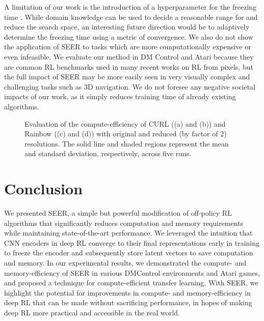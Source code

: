 \documentclass{article}
\begin{document}
A limitation of our work is the introduction of a hyperparameter for the freezing time . While domain knowledge can be used to decide a reasonable range for  and reduce the search space, an interesting future direction would be to adaptively determine the freezing time using a metric of convergence. We also do not show the application of SEER to tasks which are more computationally expensive or even infeasible. We evaluate our method in DM Control and Atari because they are common RL benchmarks used in many recent works on RL from pixels, but the full impact of SEER may be more easily seen in very visually complex and challenging tasks such as 3D navigation. We do not foresee any negative societal impacts of our work, as it simply reduces training time of already existing algorithms.

\begin{figure*} [t] \centering
{} 
\caption{Evaluation of the compute-efficiency of CURL ((a) and (b)) and Rainbow ((c) and (d)) with original and reduced (by factor of 2) resolutions. The solid line and shaded regions represent the mean and standard deviation, respectively, across five runs.} \label{fig:reduce_res_results}
\end{figure*}

\section{Conclusion}
We presented SEER, a simple but powerful modification of off-policy RL algorithms that significantly reduces computation and memory requirements while maintaining state-of-the-art performance. We leveraged the intuition that CNN encoders in deep RL converge to their final representations early in training to freeze the encoder and subsequently store latent vectors to save computation and memory. In our experimental results, we demonstrated the compute- and memory-efficiency of SEER in various DMControl environments and Atari games, and proposed a technique for compute-efficient transfer learning. With SEER, we highlight the potential for improvements in compute- and memory-efficiency in deep RL that can be made without sacrificing performance, in hopes of making deep RL more practical and accessible in the real world. 
\end{document}
